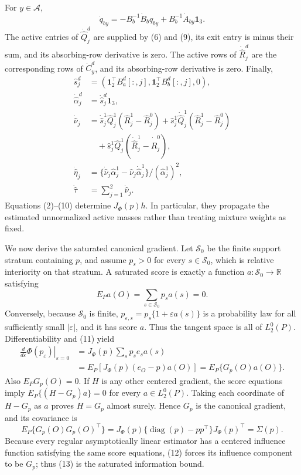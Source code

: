 For \(y\in\mathcal A\),
\[
 \dot q_{by}=-B_b^{-1}\dot B_bq_{by}+B_b^{-1}\dot A_{by}\mathbf 1_3.                         \tag{9}
\]
The active entries of \(\dot{\widehat Q}_j^d\) are supplied by (6) and (9), its exit entry is minus their sum, and its absorbing-row derivative is zero.  The active rows of \(\dot{\widehat R}_j^d\) are the corresponding rows of \(\dot C_y^d\), and its absorbing-row derivative is zero.  Finally,
\[
 \begin{aligned}
 \widehat s_j^d&=(\mathbf 1_2^\top B_a^d[:,j],\mathbf 1_2^\top B_b^d[:,j],0),\\
 \dot{\widehat\alpha}_j^d&=\dot{\widehat s}_j^d\mathbf 1_3,\\
 \dot{\widehat\nu}_j
 &=\dot{\widehat s}_j^1\widehat Q_j^1(\widehat R_j^1-\widehat R_j^0)
  +\widehat s_j^1\dot{\widehat Q}_j^1(\widehat R_j^1-\widehat R_j^0)\\
 &\quad+\widehat s_j^1\widehat Q_j^1(\dot{\widehat R}_j^1-\dot{\widehat R}_j^0),\\
 \dot{\widehat\eta}_j
 &=\{\dot{\widehat\nu}_j\widehat\alpha_j^1
      -\widehat\nu_j\dot{\widehat\alpha}_j^1\}/(\widehat\alpha_j^1)^2,\\
 \dot{\widehat\tau}&=\sum_{j=1}^2\dot{\widehat\nu}_j.
 \end{aligned}                                               \tag{10}
\]
Equations (2)--(10) determine \(J_{\Phi}(p)h\).  In particular, they propagate the estimated unnormalized active masses rather than treating mixture weights as fixed.

We now derive the saturated canonical gradient.  Let \(\mathcal S_0\) be the finite support stratum containing \(p\), and assume \(p_s>0\) for every \(s\in\mathcal S_0\), which is relative interiority on that stratum.  A saturated score is exactly a function \(a:\mathcal S_0\to\mathbb R\) satisfying
\[
 E_Pa(O)=\sum_{s\in\mathcal S_0}p_sa(s)=0.                 \tag{11}
\]
Conversely, because \(\mathcal S_0\) is finite, \(p_{\varepsilon,s}=p_s\{1+\varepsilon a(s)\}\) is a probability law for all sufficiently small \(|\varepsilon|\), and it has score \(a\).  Thus the tangent space is all of \(L_2^0(P)\).  Differentiability and (11) yield
\[
 \begin{aligned}
 \left.\frac{d}{d\varepsilon}\Phi(p_\varepsilon)\right|_{\varepsilon=0}
 &=J_{\Phi}(p)\sum_s p_se_sa(s)\\
 &=E_P\!\left[J_{\Phi}(p)(e_O-p)a(O)\right]
 =E_P\{G_p(O)a(O)\}.
 \end{aligned}                                               \tag{12}
\]
Also \(E_PG_p(O)=0\).  If \(H\) is any other centered gradient, the score equations imply \(E_P\{(H-G_p)a\}=0\) for every \(a\in L_2^0(P)\).  Taking each coordinate of \(H-G_p\) as \(a\) proves \(H=G_p\) almost surely.  Hence \(G_p\) is the canonical gradient, and its covariance is
\[
 E_P\{G_p(O)G_p(O)^\top\}
 =J_{\Phi}(p)\{\operatorname{diag}(p)-pp^\top\}J_{\Phi}(p)^\top
 =\Sigma(p).                                                \tag{13}
\]
Because every regular asymptotically linear estimator has a centered influence function satisfying the same score equations, (12) forces its influence component to be \(G_p\); thus (13) is the saturated information bound.

